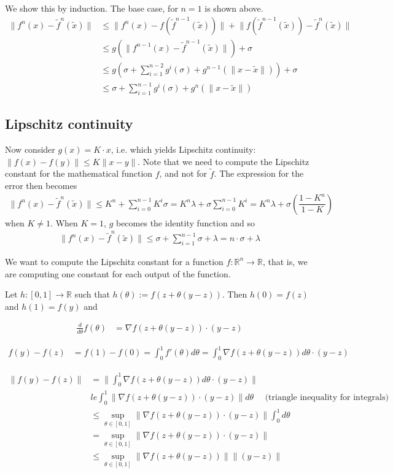 \documentclass[10pt]{article}
\newcommand{\lv}{\lVert}
\newcommand{\rv}{\rVert}
\newcommand{\tl}{\tilde}
\newcommand{\eqn}[1]{
 \begin{align} #1
 \end{align}}
\begin{document}
We show this by induction. The base case, for $n = 1$ is shown above.
\begin{align}
\lv  f^n(x) - \tl{f}^n(\tl{x})\rv &\le
  \lv f^n(x) - f(\tl{f}^{n-1}(\tl{x})) \rv + \lv f(\tl{f}^{n-1}(\tl{x})) - \tl{f}^n(\tl{x})\rv \\
  &\le g(\lv f^{n-1}(x) - \tl{f}^{n-1}(\tl{x}) \rv) + \sigma \\
  &\le g (\sigma + \sum^{n - 2}_{i = 1} g^i(\sigma) + g^{n-1}(\lv x - \tl{x} \rv)) + \sigma \\
  &\le \sigma + \sum^{n - 1}_{i = 1} g^i(\sigma) + g^n(\lv x - \tl{x} \rv)
\end{align}

\subsection{Lipschitz continuity}
Now consider $g(x) = K \cdot x$, i.e. which yields Lipschitz continuity:
$\lv f(x) - f(y) \rv \le K \lv x - y \rv$.
Note that we need to compute the Lipschitz constant for the mathematical function $f$,
and not for $\tl{f}$.
The expression for the error then becomes
\begin{align}
\lv f^n(x) - \tl{f}^n(\tl{x})\rv \le K^n + \sum^{n-1}_{i=0}K^i \sigma
  = K^n \lambda + \sigma \sum^{n-1}_{i=0} K^i
  = K^n \lambda + \sigma \left(\dfrac{1 - K^n}{1-K} \right)
\end{align}
when $K \ne 1$.
When $K = 1$, $g$ becomes the identity function and so
\begin{align}
\lv f^n(x) - \tl{f}^n(\tl{x})\rv \le \sigma + \sum^{n-1}_{i=1}\sigma + \lambda
= n \cdot \sigma + \lambda
\end{align}

We want to compute the Lipschitz constant for a function $f: \mathbb{R}^n \to \mathbb{R}$,
that is, we are computing one constant for each output of the function.

Let $h: [0, 1] \to \mathbb{R}$ such that $h(\theta) := f(z + \theta(y-z))$.
Then $h(0) = f(z)$ and $h(1) = f(y)$ and
\eqn{
  \frac{d}{d\theta}f(\theta) &= \nabla f(z + \theta(y-z)) \cdot (y-z)
}

\eqn{
  f(y) - f(z) &= f(1) -f(0) = \int^1_0 f'(\theta)d\theta
  = \int^1_0\nabla f(z + \theta(y-z)) d\theta \cdot (y-z)
}

\eqn{
  \lv f(y) - f(z) \rv &= \lv \int^1_0\nabla f(z + \theta(y-z)) d\theta \cdot (y-z) \rv \\
&le \int^1_0 \lv \nabla f(z + \theta(y-z))  \cdot (y-z) \rv d\theta \quad
   \text{ (triangle inequality for integrals)}\\
&\le \sup\limits_{\theta\in [0,1]} \lv \nabla f(z + \theta(y-z))  \cdot (y-z) \rv \int^1_0 d\theta\\
\label{eqnG}
&= \sup\limits_{\theta\in [0,1]} \lv \nabla f(z + \theta(y-z))  \cdot (y-z) \rv \\
&\le \sup\limits_{\theta\in [0,1]} \lv \nabla f(z + \theta(y-z))  \rv \rv (y-z) \rv
}
\end{document}
